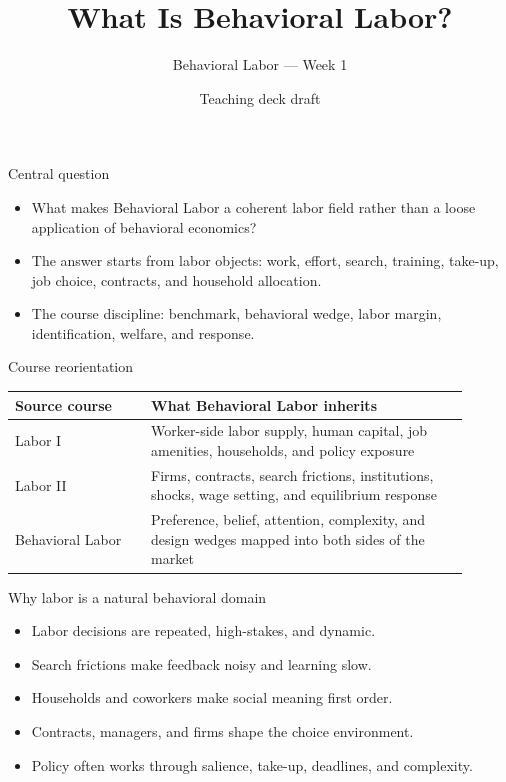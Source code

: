 \documentclass[aspectratio=169,11pt]{beamer}
\title{What Is Behavioral Labor?}
\subtitle{Behavioral Labor --- Week 1}
\author{Teaching deck draft}
\date{}
\begin{document}
\begin{frame}
  \titlepage
\end{frame}

\begin{frame}{Central question}
\begin{itemize}
    \item What makes Behavioral Labor a coherent labor field rather than a loose application of behavioral economics?
    \item The answer starts from labor objects: work, effort, search, training, take-up, job choice, contracts, and household allocation.
    \item The course discipline: benchmark, behavioral wedge, labor margin, identification, welfare, and response.
\end{itemize}
\end{frame}

\begin{frame}{Course reorientation}
\small
\begin{tabular}{p{0.27\linewidth} p{0.63\linewidth}}
\toprule
Source course & What Behavioral Labor inherits \\
\midrule
Labor I & Worker-side labor supply, human capital, job amenities, households, and policy exposure \\
Labor II & Firms, contracts, search frictions, institutions, shocks, wage setting, and equilibrium response \\
Behavioral Labor & Preference, belief, attention, complexity, and design wedges mapped into both sides of the market \\
\bottomrule
\end{tabular}
\end{frame}

\begin{frame}{Why labor is a natural behavioral domain}
\begin{itemize}
    \item Labor decisions are repeated, high-stakes, and dynamic.
    \item Search frictions make feedback noisy and learning slow.
    \item Households and coworkers make social meaning first order.
    \item Contracts, managers, and firms shape the choice environment.
    \item Policy often works through salience, take-up, deadlines, and complexity.
\end{itemize}
\end{frame}
\end{document}
